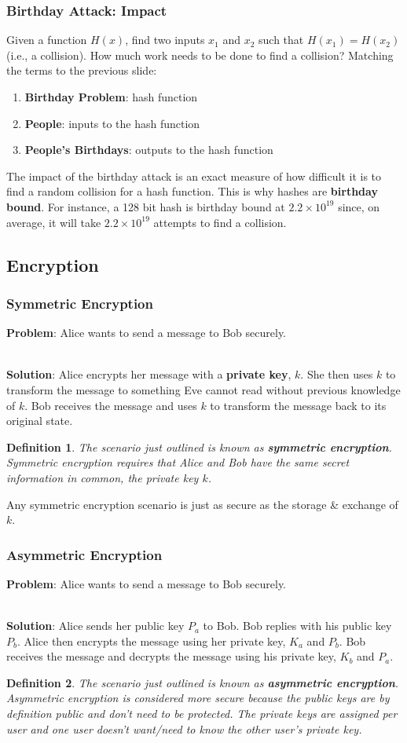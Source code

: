 \documentclass[aspectratio=169]{beamer}
\newtheorem{defn}{Definition}
\begin{document}
\begin{frame}
\frametitle{Birthday Attack: Impact}
Given a function $H(x)$, find two inputs $x_1$ and $x_2$ such that $H(x_1) = H(x_2)$ (i.e., a collision). How much work needs to be done to find a collision? Matching the terms to the previous slide:
\begin{enumerate}
	\item \textbf{Birthday Problem}: hash function
	\item \textbf{People}: inputs to the hash function
	\item \textbf{People's Birthdays}: outputs to the hash function
\end{enumerate}
The impact of the birthday attack is an exact measure of how difficult it is to find a random collision for a hash function. This is why hashes are \textbf{birthday bound}. For instance, a 128 bit hash is birthday bound at $2.2 \times 10^{19}$ since, on average, it will take $2.2 \times 10^{19}$ attempts to find a collision.
\end{frame}

\subsection{Encryption}
\begin{frame}
\frametitle{Symmetric Encryption}
\textbf{Problem}: Alice wants to send a message to Bob securely.

\mbox{}\\
\textbf{Solution}: Alice encrypts her message with a \textbf{private key}, $k$. She then uses $k$ to transform the message to something Eve cannot read without previous knowledge of $k$. Bob receives the message and uses $k$ to transform the message back to its original state.

\begin{defn}
The scenario just outlined is known as \textbf{symmetric encryption}. Symmetric encryption requires that Alice and Bob have the same secret information in common, the private key $k$.
\end{defn}
Any symmetric encryption scenario is just as secure as the storage \& exchange of $k$.
\end{frame}

\begin{frame}
\frametitle{Asymmetric Encryption}
\textbf{Problem}: Alice wants to send a message to Bob securely.

\mbox{}\\
\textbf{Solution}: Alice sends her public key $P_a$ to Bob. Bob replies with his public key $P_b$. Alice then encrypts the message using her private key, $K_a$ and $P_b$. Bob receives the message and decrypts the message using his private key, $K_b$ and $P_a$.

\begin{defn}
The scenario just outlined is known as \textbf{asymmetric encryption}. Asymmetric encryption is considered more secure because the public keys are by definition public and don't need to be protected. The private keys are assigned per user and one user doesn't want/need to know the other user's private key.
\end{defn}
\end{frame}
\end{document}
